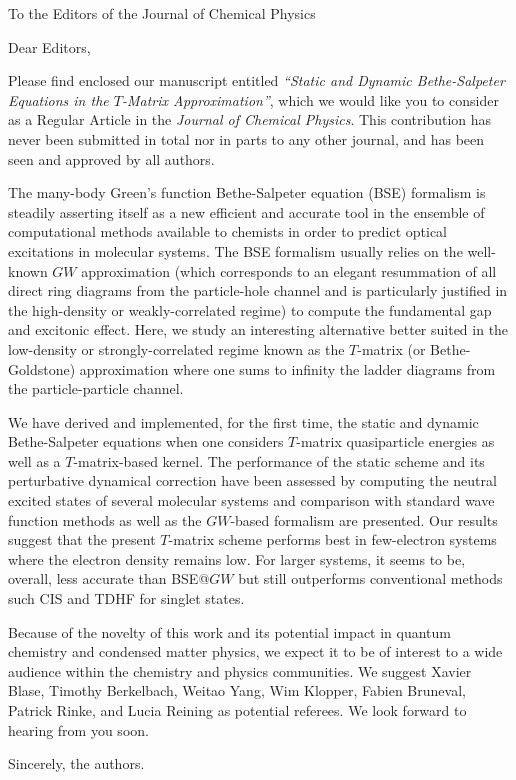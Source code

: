 \documentclass[10pt]{letter}
\begin{document}
\begin{letter}%
{To the Editors of the Journal of Chemical Physics}

\opening{Dear Editors,}

\justifying
Please find enclosed our manuscript entitled \textit{``Static and Dynamic Bethe-Salpeter Equations in the $T$-Matrix Approximation''}, which we would like you to consider as a Regular Article in the \textit{Journal of Chemical Physics}.
This contribution has never been submitted in total nor in parts to any other journal, and has been seen and approved by all authors.

The many-body Green's function Bethe-Salpeter equation (BSE) formalism is steadily asserting itself as a new efficient and accurate tool in the ensemble of computational methods available to chemists in order to predict optical excitations in molecular systems.
The BSE formalism usually relies on the well-known $GW$ approximation (which corresponds to an elegant resummation of all direct ring diagrams from the particle-hole channel and is particularly justified in the high-density or weakly-correlated regime) to compute the fundamental gap and excitonic effect. 
Here, we study an interesting alternative better suited in the low-density or strongly-correlated regime known as the $T$-matrix (or Bethe-Goldstone) approximation where one sums to infinity the ladder diagrams from the particle-particle channel.
 
We have derived and implemented, for the first time, the static and dynamic Bethe-Salpeter equations when one considers $T$-matrix quasiparticle energies as well as a $T$-matrix-based kernel. 
The performance of the static scheme and its perturbative dynamical correction have been assessed by computing the neutral excited states of several molecular systems and comparison with standard wave function methods as well as the $GW$-based formalism are presented.
Our results suggest that the present $T$-matrix scheme performs best in few-electron systems where the electron density remains low.
For larger systems, it seems to be, overall, less accurate than BSE@$GW$ but still outperforms conventional methods such CIS and TDHF for singlet states.

Because of the novelty of this work and its potential impact in quantum chemistry and condensed matter physics, we expect it to be of interest to a wide audience within the chemistry and physics communities.
We suggest Xavier Blase, Timothy Berkelbach, Weitao Yang, Wim Klopper, Fabien Bruneval, Patrick Rinke, and Lucia Reining as potential referees.
We look forward to hearing from you soon.

\closing{Sincerely, the authors.}

\end{letter}
\end{document}
